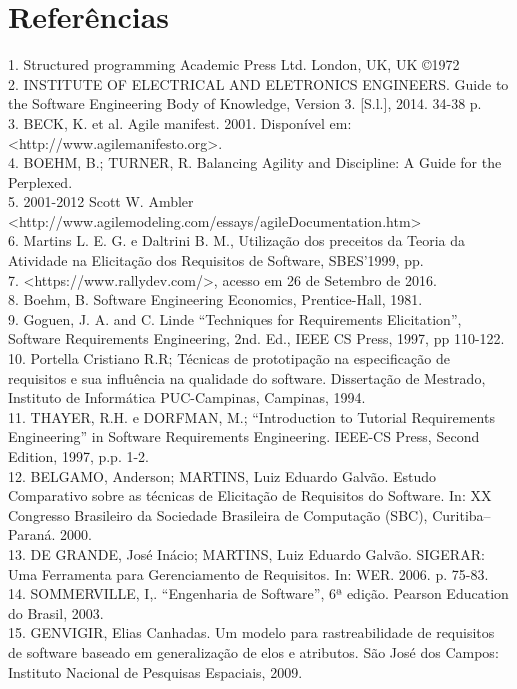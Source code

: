 
\chapter[Referências]{Referências}
1. Structured programming  Academic Press Ltd. London, UK, UK ©1972\\
2. INSTITUTE OF ELECTRICAL AND ELETRONICS ENGINEERS. Guide to the Software Engineering Body of Knowledge, Version 3. [S.l.], 2014. 34-38 p.\\
3. BECK, K. et al. Agile manifest. 2001. Disponível em: <http://www.agilemanifesto.org>.\\
4. BOEHM, B.; TURNER, R. Balancing Agility and Discipline: A Guide for the Perplexed.\\
5. 2001-2012 Scott W. Ambler \\<http://www.agilemodeling.com/essays/agileDocumentation.htm>\\
6. Martins L. E. G. e Daltrini B. M., Utilização dos preceitos da Teoria da Atividade na Elicitação dos Requisitos de Software, SBES’1999, pp.\\
7. <https://www.rallydev.com/>, acesso em 26 de Setembro de 2016.\\
8. Boehm, B. Software Engineering Economics, Prentice-Hall, 1981.\\
9. Goguen, J. A. and C. Linde “Techniques for Requirements Elicitation”, Software Requirements Engineering, 2nd. Ed., IEEE CS Press, 1997, pp 110-122.\\
10. Portella Cristiano R.R; Técnicas de prototipação na especificação de requisitos e sua influência na qualidade do software. Dissertação de Mestrado, Instituto de Informática PUC-Campinas, Campinas, 1994.\\
11. THAYER, R.H. e DORFMAN, M.; “Introduction to Tutorial Requirements Engineering” in Software Requirements Engineering. IEEE-CS Press, Second Edition, 1997, p.p. 1-2.\\
12. BELGAMO, Anderson; MARTINS, Luiz Eduardo Galvão. Estudo Comparativo sobre as técnicas de Elicitação de Requisitos do Software. In: XX Congresso Brasileiro da Sociedade Brasileira de Computação (SBC), Curitiba–Paraná. 2000.\\
13. DE GRANDE, José Inácio; MARTINS, Luiz Eduardo Galvão. SIGERAR: Uma Ferramenta para Gerenciamento de Requisitos. In: WER. 2006. p. 75-83.\\
14. SOMMERVILLE, I,. “Engenharia de Software”, 6ª edição. Pearson Education do Brasil, 2003.\\
15. GENVIGIR, Elias Canhadas. Um modelo para rastreabilidade de requisitos de software baseado em generalização de elos e atributos. São José dos Campos: Instituto Nacional de Pesquisas Espaciais, 2009.\\
